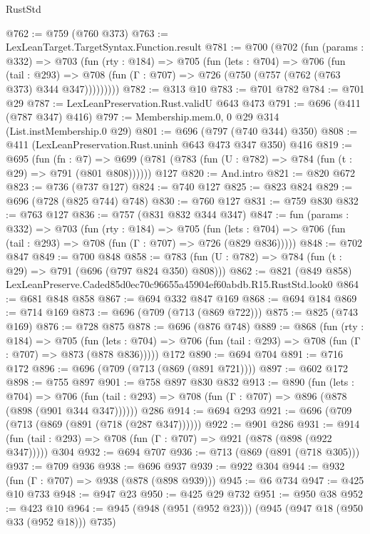 \begin{lexlean}{RustStd}
\begin{coremodule}
@762 := @759 (@760 @373)
@763 := LexLeanTarget.TargetSyntax.Function.result
@781 := @700
    (@702
      (fun (params : @332) =>
      @703
        (fun (rty : @184) =>
        @705
          (fun (lets : @704) =>
          @706
            (fun (tail : @293) =>
            @708 (fun (Γ : @707) => @726 (@750 (@757 (@762 (@763 @373) @344 @347)))))))))
@782 := @313 @10
@783 := @701 @782
@784 := @701 @29
@787 := LexLeanPreservation.Rust.validU @643 @473
@791 := @696 (@411 (@787 @347) @416)
@797 := Membership.mem.{0, 0} @29 @314 (List.instMembership.{0} @29)
@801 := @696 (@797 (@740 @344) @350)
@808 := @411 (LexLeanPreservation.Rust.uninh @643 @473 @347 @350) @416
@819 := @695
    (fun (fn : @7) =>
    @699 (@781 (@783 (fun (U : @782) => @784 (fun (t : @29) => @791 (@801 @808))))))
    @127
@820 := And.intro
@821 := @820 @672
@823 := @736 (@737 @127)
@824 := @740 @127
@825 := @823 @824
@829 := @696 (@728 (@825 @744) @748)
@830 := @760 @127
@831 := @759 @830
@832 := @763 @127
@836 := @757 (@831 @832 @344 @347)
@847 := fun (params : @332) =>
  @703
    (fun (rty : @184) =>
    @705
      (fun (lets : @704) => @706 (fun (tail : @293) => @708 (fun (Γ : @707) => @726 (@829 @836)))))
@848 := @702 @847
@849 := @700 @848
@858 := @783 (fun (U : @782) => @784 (fun (t : @29) => @791 (@696 (@797 @824 @350) @808)))
@862 := @821 (@849 @858) LexLeanPreserve.Caded85d0ec70c96655a45904ef60abdb.R15.RustStd.look0
@864 := @681 @848 @858
@867 := @694 @332 @847 @169
@868 := @694 @184
@869 := @714 @169
@873 := @696 (@709 (@713 (@869 @722)))
@875 := @825 (@743 @169)
@876 := @728 @875
@878 := @696 (@876 @748)
@889 := @868
    (fun (rty : @184) =>
    @705
      (fun (lets : @704) => @706 (fun (tail : @293) => @708 (fun (Γ : @707) => @873 (@878 @836)))))
    @172
@890 := @694 @704
@891 := @716 @172
@896 := @696 (@709 (@713 (@869 (@891 @721))))
@897 := @602 @172
@898 := @755 @897
@901 := @758 @897 @830 @832
@913 := @890
    (fun (lets : @704) =>
    @706 (fun (tail : @293) => @708 (fun (Γ : @707) => @896 (@878 (@898 (@901 @344 @347))))))
    @286
@914 := @694 @293
@921 := @696 (@709 (@713 (@869 (@891 (@718 (@287 @347))))))
@922 := @901 @286
@931 := @914 (fun (tail : @293) => @708 (fun (Γ : @707) => @921 (@878 (@898 (@922 @347))))) @304
@932 := @694 @707
@936 := @713 (@869 (@891 (@718 @305)))
@937 := @709 @936
@938 := @696 @937
@939 := @922 @304
@944 := @932 (fun (Γ : @707) => @938 (@878 (@898 @939)))
@945 := @6 @734
@947 := @425 @10 @733
@948 := @947 @23
@950 := @425 @29 @732
@951 := @950 @38
@952 := @423 @10
@964 := @945 (@948 (@951 (@952 @23))) (@945 (@947 @18 (@950 @33 (@952 @18))) @735)

\end{coremodule}
\end{lexlean}
